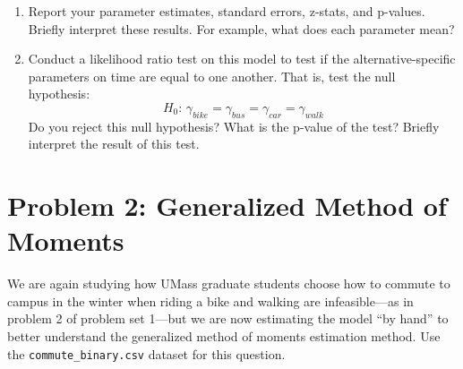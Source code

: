 \documentclass[11pt,letterpaper]{article}
\begin{document}
\begin{enumerate}[label=\alph*., leftmargin=*]
	\begin{enumerate}[label=\roman*.]
		\item Report your parameter estimates, standard errors, z-stats, and p-values. Briefly interpret these results. For example, what does each parameter mean?

		\item Conduct a likelihood ratio test on this model to test if the alternative-specific parameters on time are equal to one another. That is, test the null hypothesis:
		$$H_0 \text{: } \gamma_{bike} = \gamma_{bus} = \gamma_{car} = \gamma_{walk}$$
		Do you reject this null hypothesis? What is the p-value of the test? Briefly interpret the result of this test.
	\end{enumerate}
\end{enumerate}

\section*{Problem 2: Generalized Method of Moments}

We are again studying how UMass graduate students choose how to commute to campus in the winter when riding a bike and walking are infeasible---as in problem 2 of problem set 1---but we are now estimating the model ``by hand'' to better understand the generalized method of moments estimation method. Use the \texttt{commute\_binary.csv} dataset for this question.
\end{document}
